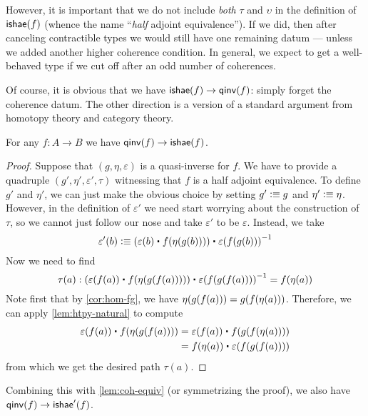 However, it is important that we do not include \emph{both} $\tau$ and $\upsilon$ in the definition of $\mathsf{ishae} (f)$ (whence the name ``\emph{half} adjoint equivalence'').
If we did, then after canceling contractible types we would still have one remaining datum --- unless we added another higher coherence condition.
In general, we expect to get a well-behaved type if we cut off after an odd number of coherences.

Of course, it is obvious that we have $\mathsf{ishae}(f) \to\mathsf{qinv}(f)$: simply forget the coherence datum.
The other direction is a version of a standard argument from homotopy theory and category theory.

\begin{thm}\label{thm:equiv-iso-adj}
  For any $f:A\to B$ we have $\mathsf{qinv}(f)\to\mathsf{ishae}(f)$.
\end{thm}
\begin{proof}
Suppose that $(g,\eta,\varepsilon)$ is a quasi-inverse for $f$. We have to provide
a quadruple $(g',\eta',\varepsilon',\tau)$ witnessing that $f$ is a half adjoint equivalence. To
define $g'$ and $\eta'$, we can just make the obvious choice by setting $g'
\vcentcolon\equiv g$ and $\eta'\vcentcolon\equiv \eta$. However, in the definition of $\varepsilon'$ we
need start worrying about the construction of $\tau$, so we cannot just follow our nose
and take $\varepsilon'$ to be $\varepsilon$. Instead, we take
\begin{equation*}
\varepsilon'(b) \defeq (\varepsilon(b)\ct \ap{f}{\eta(g(b))})\ct \opp{\varepsilon(f(g(b)))}
\end{equation*}
Now we need to find
\begin{equation*}
\tau(a):(\varepsilon(f(a))\ct \ap{f}{\eta(g(f(a)))})\ct \opp{\varepsilon(f(g(f(a))))}=\ap{f}{\eta(a)}
\end{equation*}
Note first that by \autoref{cor:hom-fg}, we have 
$\eta(g(f(a)))={g}({{f}({\eta(a)})})$. Therefore, we can apply
\autoref{lem:htpy-natural} to compute
\begin{align*}
\varepsilon(f(a))\ct \ap{f}{\eta(g(f(a)))}
& = \varepsilon(f(a))\ct \ap{f}{\ap{g}{\ap{f}{\eta(a)}}}\\
& = \ap{f}{\eta(a)}\ct\varepsilon(f(g(f(a))))
\end{align*}
from which we get the desired path $\tau(a)$.
\end{proof}

Combining this with \autoref{lem:coh-equiv} (or symmetrizing the proof), we also have $\mathsf{qinv}(f)\to\mathsf{ishae}'(f)$.


